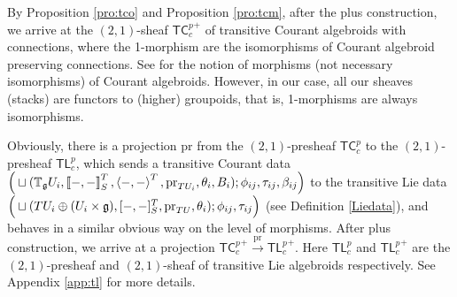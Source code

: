 \documentclass[letterpaper,10pt, oneside]{article} %
\newcommand {\cc}[1]{{\marginpar{*}\scriptsize\textcolor{red}{cc: #1}}}
\newcommand{\tlp}{{\mathsf{TL}^{p}_{c}}} %
\newcommand{\tcalgdp}{{\mathsf{TC}^{p}_{c}}} %
\DeclareMathOperator{\holim}{\mathsf{holim}}
\newcommand{\tagui}{{\mathbb{T}_\g U_i}}
\newcommand{\pair}[1]{\left\langle #1\right\rangle}
\newcommand{\Courant}[1]{\left\llbracket  #1\right\rrbracket }
\newcommand{\pr}{\mathrm{pr}}
\begin{document}

By Proposition \ref{pro:tco} and Proposition \ref{pro:tcm},  after the
plus construction, we arrive at the $(2,1)$-sheaf ${\tcalgdp}^+$ of
transitive Courant algebroids with connections, where the 1-morphism
are the isomorphisms of Courant algebroid preserving connections. See
\cite{LBM} for the notion of morphisms (not necessary isomorphisms) of
Courant algebroids. However, in our case, all our sheaves (stacks) are
functors to (higher) groupoids, that is, 1-morphisms are always isomorphisms.



Obviously, there is a projection $\pr$ from the $(2,1)$-presheaf $\tcalgdp$ to the $(2,1)$-presheaf $\tlp$, which sends a transitive Courant data $\Big(\sqcup(\tagui, \Courant{-,-}^T_S,  \pair{-,-}^T,\pr_{TU_i},\theta_i,B_i);\phi_{ij},\tau_{ij},\beta_{ij} \Big)$ to the transitive Lie data $\Big(\sqcup (TU_i\oplus(U_i\times\g),
  [-,-]^T_S,\pr_{TU},\theta_i);\phi_{ij},\tau_{ij} \Big)$ (see Definition \ref{Liedata}), and behaves in a similar obvious way on the level of morphisms. After plus construction, we arrive at a projection $\tcalgdp^+\xrightarrow{\pr}\tlp^+$. Here $\tlp$ and $ \tlp^+$ are the $(2,1)$-presheaf and $(2,1)$-sheaf of transitive Lie algebroids respectively. See Appendix \ref{app:tl} for more details.

\end{document}
